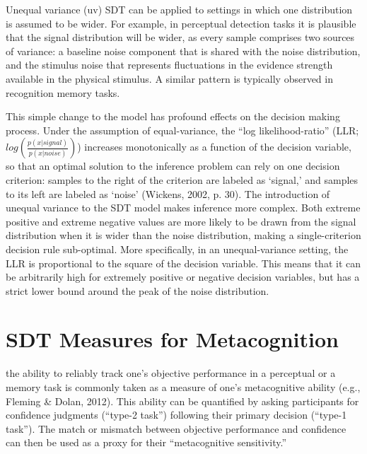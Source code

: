 \documentclass[12pt,twoside]{reedthesis}
\begin{document}
Unequal variance (uv) SDT can be applied to settings in which one distribution is assumed to be wider. For example, in perceptual detection tasks it is plausible that the signal distribution will be wider, as every sample comprises two sources of variance: a baseline noise component that is shared with the noise distribution, and the stimulus noise that represents fluctuations in the evidence strength available in the physical stimulus. A similar pattern is typically observed in recognition memory tasks.

This simple change to the model has profound effects on the decision making process. Under the assumption of equal-variance, the ``log likelihood-ratio'' (LLR; \(log(\frac{p(x|signal)}{p(x|noise)})\)) increases monotonically as a function of the decision variable, so that an optimal solution to the inference problem can rely on one decision criterion: samples to the right of the criterion are labeled as `signal,' and samples to its left are labeled as `noise' (Wickens, 2002, p. 30). The introduction of unequal variance to the SDT model makes inference more complex. Both extreme positive and extreme negative values are more likely to be drawn from the signal distribution when it is wider than the noise distribution, making a single-criterion decision rule sub-optimal. More specifically, in an unequal-variance setting, the LLR is proportional to the square of the decision variable. This means that it can be arbitrarily high for extremely positive or negative decision variables, but has a strict lower bound around the peak of the noise distribution.

\hypertarget{app1-mc}{%
\section{SDT Measures for Metacognition}\label{app1-mc}}

the ability to reliably track one's objective performance in a perceptual or a memory task is commonly taken as a measure of one's metacognitive ability (e.g., Fleming \& Dolan, 2012). This ability can be quantified by asking participants for confidence judgments (``type-2 task'') following their primary decision (``type-1 task''). The match or mismatch between objective performance and confidence can then be used as a proxy for their ``metacognitive sensitivity.''
\end{document}
